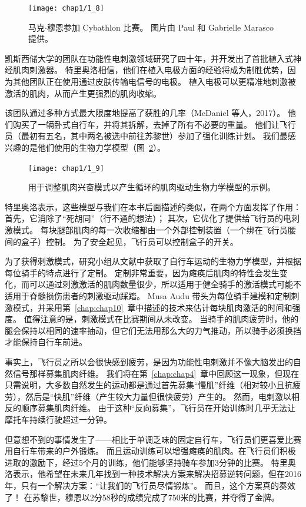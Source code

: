 \begin{figure}[!htb]
	\centering
	\texttt{[image: chap1/1\_8]}
	\caption{马克$\cdot$穆恩参加 Cybathlon 比赛。
		图片由 Paul 和 Gabrielle Marasco 提供。 \label{fig:1_8}}
\end{figure}


凯斯西储大学的团队在功能性电刺激领域研究了四十年，并开发出了首批植入式神经肌肉刺激器。
特里奥洛相信，他们在植入电极方面的经验将成为制胜优势，因为其他团队正在使用通过皮肤传输电信号的电极。
植入电极可以更精准地刺激被激活的肌肉，从而产生更强烈的肌肉收缩。


该团队通过多种方式最大限度地提高了获胜的几率（McDaniel 等人，2017）。
他们购买了一辆卧式自行车，并将其拆解，去掉了所有不必要的重量。
他们让飞行员（最初有五名，其中两名被选中前往苏黎世）参加了强化训练计划。
我们最感兴趣的是他们使用的生物力学模型（图~\ref{fig:1_9}）。


\begin{figure}[!htb]
	\centering
	\texttt{[image: chap1/1\_9]}
	\caption{用于调整肌肉兴奋模式以产生循环的肌肉驱动生物力学模型的示例。 \label{fig:1_9}}
\end{figure}


特里奥洛表示，这些模型与我们在本书后面描述的类似，在两个方面发挥了作用：
首先，它消除了“死胡同”（行不通的想法）；
其次，它优化了提供给飞行员的电刺激模式。
每块腿部肌肉的每一次收缩都由一个外部控制装置（一个绑在飞行员腰间的盒子）控制。
为了安全起见，飞行员可以控制盒子的开关。


为了获得刺激模式，研究小组从文献中获取了自行车运动的生物力学模型，并根据每位骑手的特点进行了定制。
定制非常重要，因为瘫痪后肌肉的特性会发生变化，而可以通过刺激激活的肌肉数量很少，所以适用于健全骑手的激活模式可能不适用于脊髓损伤患者的刺激驱动踩踏。
Musa Audu 带头为每位骑手建模和定制刺激模式，并采用第~\ref{chap:chap10}~章中描述的技术来估计每块肌肉激活的时间和强度。
值得注意的是，刺激模式在比赛期间从未改变。
当骑手的肌肉疲劳时，他的腿会保持以相同的速率抽动，但它们无法用那么大的力气推动，所以骑手必须换挡才能保持自行车前进。


事实上，飞行员之所以会很快感到疲劳，是因为功能性电刺激并不像大脑发出的自然信号那样募集肌肉纤维。
我们将在第~\ref{chap:chap4}~章中回顾这一现象，但现在只需说明，大多数自然发生的运动都是通过首先募集“慢肌”纤维（相对较小且抗疲劳），然后是“快肌”纤维（产生较大力量但很快疲劳）产生的。
然而，电刺激以相反的顺序募集肌肉纤维。
由于这种“反向募集”，飞行员在开始训练时几乎无法让摩托车持续行驶超过一分钟。



但意想不到的事情发生了——相比于单调乏味的固定自行车，飞行员们更喜爱比赛用自行车带来的户外锻炼。
而且运动训练可以增强瘫痪的肌肉。在飞行员们积极进取的激励下，经过5个月的训练，他们能够坚持骑车参加3分钟的比赛。
特里奥洛表示，他希望在未来几年找到一种技术解决方案来解决招募逆转问题，但在2016年，只有一个解决方案：“让我们的飞行员尽情锻炼”。
而且，这个方案真的奏效了！
在苏黎世，穆恩以2分58秒的成绩完成了750米的比赛，并夺得了金牌。


